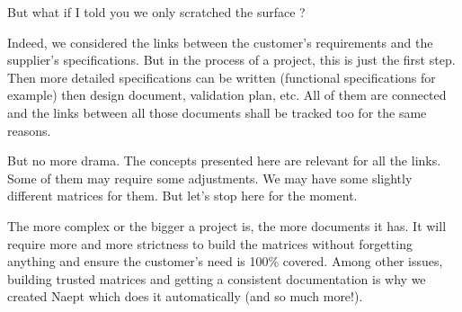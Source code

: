 But what if I told you we only scratched the surface ?

Indeed, we considered the links between the customer’s requirements and the supplier’s specifications. But in the process of a project, this is just the first step. Then more detailed specifications can be written (functional specifications for example) then design document, validation plan, etc. All of them are connected and the links between all those documents shall be tracked too for the same reasons.

But no more drama. The concepts presented here are relevant for all the links. Some of them may require some adjustments. We may have some slightly different matrices for them. But let’s stop here for the moment.

The more complex or the bigger a project is, the more documents it has. It will require more and more strictness to build the matrices without forgetting anything and ensure the customer’s need is 100\% covered. Among other issues, building trusted matrices and getting a consistent documentation is why we created Naept which does it automatically (and so much more!).
